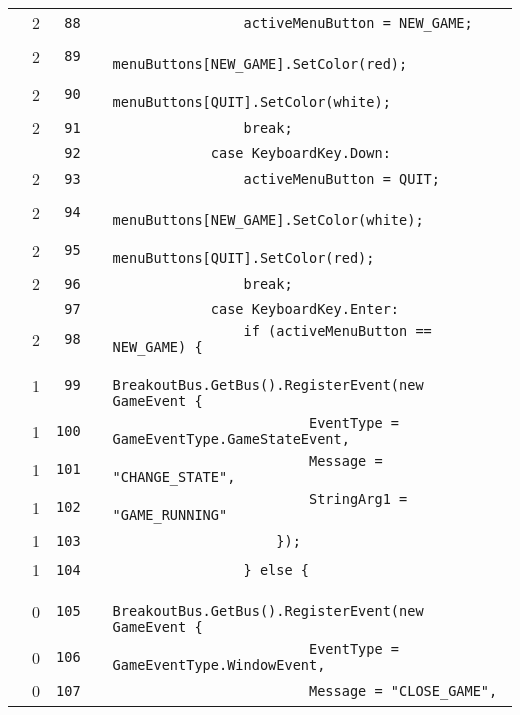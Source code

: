 \documentclass[a4paper,landscape,10pt]{article}
\begin{document}
\begin{longtable}[l]{lrrll}
\cellcolor{green} & 2 & \verb~88~ & & \verb~                activeMenuButton = NEW_GAME;~\\
\cellcolor{green} & 2 & \verb~89~ & & \verb~                menuButtons[NEW_GAME].SetColor(red);~\\
\cellcolor{green} & 2 & \verb~90~ & & \verb~                menuButtons[QUIT].SetColor(white);~\\
\cellcolor{green} & 2 & \verb~91~ & & \verb~                break;~\\
\cellcolor{gray} &  & \verb~92~ & & \verb~            case KeyboardKey.Down:~\\
\cellcolor{green} & 2 & \verb~93~ & & \verb~                activeMenuButton = QUIT;~\\
\cellcolor{green} & 2 & \verb~94~ & & \verb~                menuButtons[NEW_GAME].SetColor(white);~\\
\cellcolor{green} & 2 & \verb~95~ & & \verb~                menuButtons[QUIT].SetColor(red);~\\
\cellcolor{green} & 2 & \verb~96~ & & \verb~                break;~\\
\cellcolor{gray} &  & \verb~97~ & & \verb~            case KeyboardKey.Enter:~\\
\cellcolor{orange} & 2 & \verb~98~ & & \verb~                if (activeMenuButton == NEW_GAME) {~\\
\cellcolor{green} & 1 & \verb~99~ & & \verb~                    BreakoutBus.GetBus().RegisterEvent(new GameEvent {~\\
\cellcolor{green} & 1 & \verb~100~ & & \verb~                        EventType = GameEventType.GameStateEvent,~\\
\cellcolor{green} & 1 & \verb~101~ & & \verb~                        Message = "CHANGE_STATE",~\\
\cellcolor{green} & 1 & \verb~102~ & & \verb~                        StringArg1 = "GAME_RUNNING"~\\
\cellcolor{green} & 1 & \verb~103~ & & \verb~                    });~\\
\cellcolor{green} & 1 & \verb~104~ & & \verb~                } else {~\\
\cellcolor{red} & 0 & \verb~105~ & & \verb~                    BreakoutBus.GetBus().RegisterEvent(new GameEvent {~\\
\cellcolor{red} & 0 & \verb~106~ & & \verb~                        EventType = GameEventType.WindowEvent,~\\
\cellcolor{red} & 0 & \verb~107~ & & \verb~                        Message = "CLOSE_GAME",~\\

\end{longtable}
\end{document}
